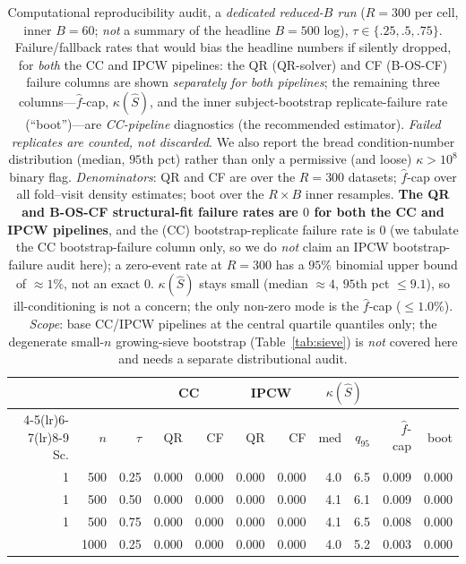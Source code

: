 \begin{table}[t]\centering\small
\caption{Computational reproducibility audit, a \emph{dedicated reduced-$B$ run} ($R=300$ per cell, inner $B{=}60$; \emph{not} a summary of the headline $B{=}500$ log), $\tau\in\{.25,.5,.75\}$. Failure/fallback rates that would bias the headline numbers if silently dropped, for \emph{both} the CC and IPCW pipelines: the QR (QR-solver) and CF (B-OS-CF) failure columns are shown \emph{separately for both pipelines}; the remaining three columns---$\widehat f$-cap, $\kappa(\widehat S)$, and the inner subject-bootstrap replicate-failure rate (``boot'')---are \emph{CC-pipeline} diagnostics (the recommended estimator). \emph{Failed replicates are counted, not discarded}. We also report the bread condition-number distribution (median, $95$th pct) rather than only a permissive (and loose) $\kappa>10^8$ binary flag. \emph{Denominators}: QR and CF are over the $R{=}300$ datasets; $\widehat f$-cap over all fold--visit density estimates; boot over the $R{\times}B$ inner resamples. \textbf{The QR and B-OS-CF structural-fit failure rates are $0$ for both the CC and IPCW pipelines}, and the (CC) bootstrap-replicate failure rate is $0$ (we tabulate the CC bootstrap-failure column only, so we do \emph{not} claim an IPCW bootstrap-failure audit here); a zero-event rate at $R{=}300$ has a $95\%$ binomial upper bound of $\approx1\%$, not an exact $0$. $\kappa(\widehat S)$ stays small (median $\approx4$, $95$th pct $\le9.1$), so ill-conditioning is not a concern; the only non-zero mode is the $\widehat f$-cap ($\le1.0\%$). \emph{Scope}: base CC/IPCW pipelines at the central quartile quantiles only; the degenerate small-$n$ growing-sieve bootstrap (Table~\ref{tab:sieve}) is \emph{not} covered here and needs a separate distributional audit.}
\label{tab:audit}\begin{tabular}{rrr rr rr rr rr}\toprule
&&&\multicolumn{2}{c}{CC}&\multicolumn{2}{c}{IPCW}&\multicolumn{2}{c}{$\kappa(\widehat S)$}&&\\
\cmidrule(lr){4-5}\cmidrule(lr){6-7}\cmidrule(lr){8-9}
Sc.&$n$&$\tau$&QR&CF&QR&CF&med&$q_{95}$&$\widehat f$-cap&boot\\\midrule
1 & 500 & 0.25 & 0.000 & 0.000 & 0.000 & 0.000 & 4.0 & 6.5 & 0.009 & 0.000 \\
1 & 500 & 0.50 & 0.000 & 0.000 & 0.000 & 0.000 & 4.1 & 6.1 & 0.009 & 0.000 \\
1 & 500 & 0.75 & 0.000 & 0.000 & 0.000 & 0.000 & 4.1 & 6.5 & 0.008 & 0.000 \\
\addlinespace
1 & 1000 & 0.25 & 0.000 & 0.000 & 0.000 & 0.000 & 4.0 & 5.2 & 0.003 & 0.000 \\

\end{tabular}
\end{table}
